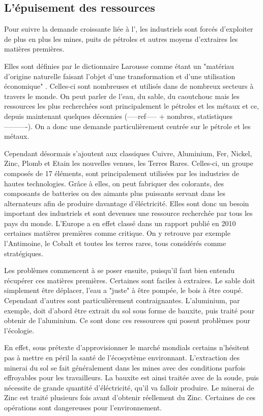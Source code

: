 \subsection{L’épuisement des ressources}

Pour suivre la demande croissante liée à l'\op, les industriels sont forcés d'exploiter de plus en plus les mines, puits de pétroles et autres moyens d'extraires les matières premières.

\medbreak Elles sont définies par le dictionnaire Larousse comme étant un "matériau d'origine naturelle faisant l'objet d'une transformation et d'une utilisation économique" \cite{LarousseMatiere1eres}. Celles-ci sont nombreuses et utilisés dans de nombreux secteurs à travers le monde. On peut parler de l'eau, du sable, du caoutchouc mais les ressources les plus recherchées sont principalement le pétroles et les métaux et ce, depuis maintenant quelques décennies (-----ref----- + nombres, statistiques----------). On a donc une demande particulièrement centrée sur le pétrole et les métaux.

Cependant désormais s'ajoutent aux classiques Cuivre, Aluminium, Fer, Nickel, Zinc, Plomb et Etain les nouvelles venues, les Terres Rares. Celles-ci, un groupe composés de 17 éléments, sont principalement utilisées par les industries de hautes technologies. Grâce à elles, on peut fabriquer des colorants, des composants de batteries ou des aimants plus puissants servant dans les alternateurs afin de produire davantage d'éléctricité. Elles sont donc un besoin important des industriels et sont devenues une ressource recherchée par tous les pays du monde. L'Europe a en effet classé dans un rapport publié en 2010 \cite{RapportEuropeenTerresRares} certaines matières premières comme critique. On y retrouve par exemple l'Antimoine, le Cobalt et toutes les terres rares, tous considérés comme stratégiques.


\medbreak Les problèmes commencent à se poser ensuite, puisqu'il faut bien entendu récupérer ces matières premières. Certaines sont faciles à extraires. Le sable doit simplement être déplacer, l'eau a "juste" à être pompée, le bois à être coupé. Cependant d'autres sont particulièrement contraignantes. L'aluminium, par exemple, doit d'abord être extrait du sol sous forme de bauxite, puis traité pour obtenir de l'aluminium. Ce sont donc ces ressources qui posent problèmes pour l'écologie.

En effet, sous prétexte d'approvisionner le marché mondials certains n'hésitent pas à mettre en péril la santé de l'écosystème environnant. L'extraction des minerai du sol se fait généralement dans les mines avec des conditions parfois effroyables pour les travailleurs. La bauxite est ainsi traitée avec de la soude, puis nécessite de grande quantité d'éléctricité, qu'il va falloir produire. Le minerai de Zinc est traité plusieurs fois avant d'obtenir réellement du Zinc. Certaines de ces opérations sont dangereuses pour l'environnement.

